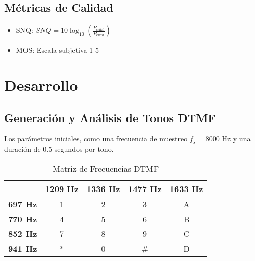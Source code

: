 \documentclass[journal]{IEEEtran} %
\begin{document}
\subsection{Métricas de Calidad}
\begin{itemize}
    \item SNQ: $SNQ = 10\log_{10}\left(\frac{P_{\text{señal}}}{P_{\text{error}}}\right)$
    \item MOS: Escala subjetiva 1-5
\end{itemize}

\section{Desarrollo}


\subsection{Generación y Análisis de Tonos DTMF}\label{AA}
Los parámetros iniciales, como una frecuencia de muestreo $f_s=8000$ Hz y una duración de 0.5 segundos por tono.

\begin{table}[htbp]
    \caption{Matriz de Frecuencias DTMF}
    \begin{center}
        \begin{tabular}{|c|c|c|c|c|}
            \hline
            \textbf{} & \textbf{1209 Hz} & \textbf{1336 Hz} & \textbf{1477 Hz} & \textbf{1633 Hz} \\
            \hline
            \textbf{697 Hz} & 1 & 2 & 3 & A \\
            \hline
            \textbf{770 Hz} & 4 & 5 & 6 & B \\
            \hline
            \textbf{852 Hz} & 7 & 8 & 9 & C \\
            \hline
            \textbf{941 Hz} & * & 0 & \# & D \\
            \hline
        \end{tabular}
        \label{tab:dtmf}
    \end{center}
\end{table}
\end{document}

